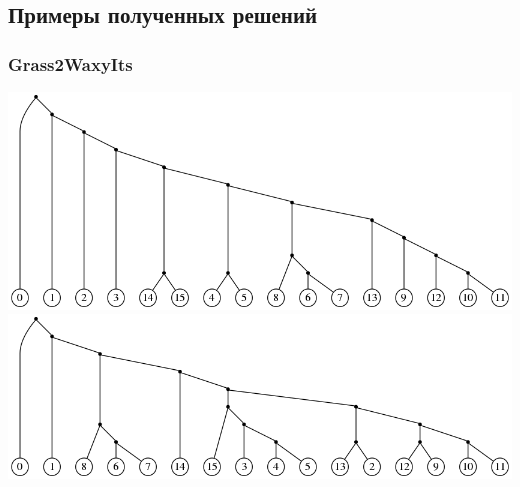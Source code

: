\documentclass[hyperref={unicode}]{beamer}
\begin{document}
%
%

\subsection{Примеры полученных решений}

\begin{frame}
\frametitle{Grass2WaxyIts}

\centering
\includegraphics[width=0.87\linewidth]{img/Grass2WaxyIts_tree0}
\\
\includegraphics[width=0.87\linewidth]{img/Grass2WaxyIts_tree1}
	
\end{frame}
\end{document}
